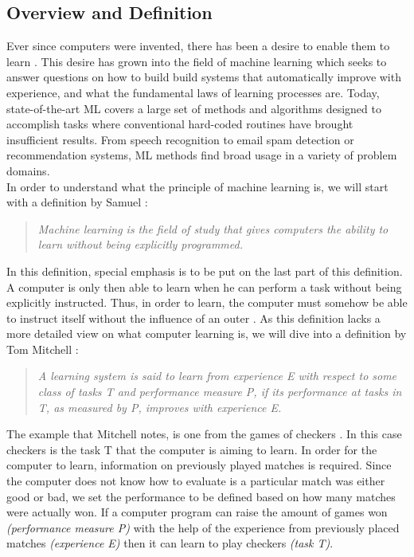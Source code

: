\subsection{Overview and Definition}

Ever since computers were invented, there has been a desire to enable them to learn \cite{samuel2000some}. This desire has grown into the field of machine learning which seeks to answer questions on how to build build systems that automatically improve with experience, and what the fundamental laws of learning processes are. Today, state-of-the-art ML covers a large set of methods and algorithms designed to accomplish tasks where conventional hard-coded routines have brought insufficient results. From speech recognition to email spam detection or recommendation systems, ML methods find broad usage in a variety of problem domains. \\

In order to understand what the principle of machine learning is, we will start with a definition by Samuel \cite{samuel2000some}:\\
\begin{quote}
\textit{Machine learning is the field of study that gives computers the ability to learn without being explicitly programmed.}\\
\end{quote}

In this definition, special emphasis is to be put on the last part of this definition. A computer is only then able to learn when he can perform a task without being explicitly instructed. Thus, in order to learn, the computer must somehow be able to instruct itself without the influence of an outer . As this definition lacks a more detailed view on what computer learning is, we will dive into a definition by Tom Mitchell \cite{mitchell2006discipline}:\\
\begin{quote}
\textit{A learning system is said to learn from experience E with respect to some class of tasks T and performance measure P, if its performance at tasks in T, as measured by P, improves with experience E.}\\
\end{quote}

The example that Mitchell notes, is one from the games of checkers \cite{mitchell2006discipline}. In this case checkers is the task T that the computer is aiming to learn. In order for the computer to learn, information on previously played matches is required. Since the computer does not know how to evaluate is a particular match was either good or bad, we set the performance to be defined based on how many matches were actually won. If a computer program can raise the amount of games won \textit{(performance measure P)} with the help of the experience from previously placed matches \textit{(experience E)} then it can learn to play checkers \textit{(task T)}. \\

